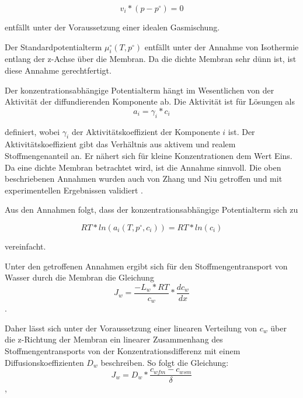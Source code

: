 \begin{normalsize}
\begin{equation}
v_{i}*(p-p^\circ)= 0
\end{equation}

entfällt unter der Voraussetzung einer idealen Gasmischung.

Der Standardpotentialterm $\mu_{i}^\circ(T,p^\circ)$ entfällt unter der Annahme von Isothermie entlang der z-Achse über die Membran. Da die dichte Membran sehr dünn ist, ist diese Annahme gerechtfertigt.

Der konzentrationsabhängige Potentialterm hängt im Wesentlichen von der Aktivität der diffundierenden Komponente ab. Die Aktivität ist für Lösungen als
\begin{equation}
a_{i} = \gamma_{i}  * c_{i}
\end{equation}

definiert, wobei $\gamma_{i}$ der Aktivitätskoeffizient der Komponente $i$ ist. Der Aktivitätskoeffizient gibt das Verhältnis aus aktivem und realem Stoffmengenanteil an. Er nähert sich für kleine Konzentrationen dem Wert Eins. Da eine dichte Membran betrachtet wird, ist die Annahme sinnvoll.
Die oben beschriebenen Annahmen wurden auch von Zhang und Niu getroffen und mit experimentellen Ergebnissen validiert \cite{Zhang.2002b}. 

Aus den Annahmen folgt, dass der konzentrationsabhängige Potentialterm sich zu 

\begin{equation}
RT*ln(a_{i}(T,p^\circ,c_{i})) = RT*ln(c_{i})
\end{equation}

vereinfacht.

Unter den getroffenen Annahmen ergibt sich für den Stoffmengentransport von Wasser durch die Membran die Gleichung
\begin{equation}
J_{w} = \frac{-L_{w}*RT}{c_{w}} * \frac{d c_{w}}{dx}
\end{equation}.

Daher lässt sich unter der Voraussetzung einer linearen Verteilung von $c_{w}$ über die z-Richtung der Membran ein linearer Zusammenhang des Stoffmengentransports von der Konzentrationsdifferenz mit einem Diffusionskoeffizienten $D_{w}$ beschreiben. So folgt die Gleichung:
\begin{equation}
J_{w} = D_{w} * \dfrac{c_{wfm}-c_{wsm}}{\delta}
\end{equation},


\end{normalsize}

